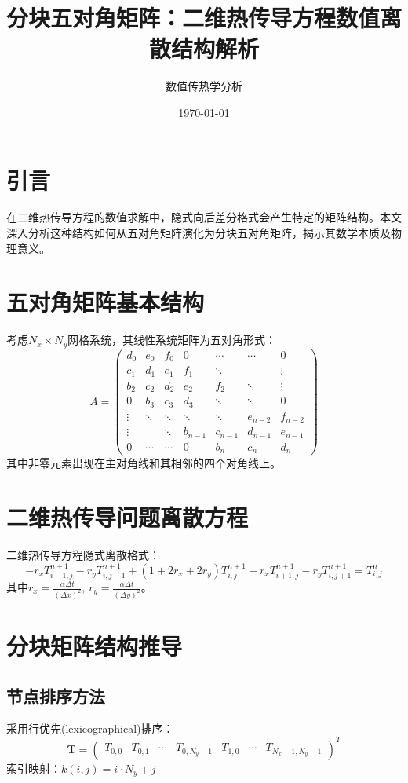\documentclass{ctexart}
\title{分块五对角矩阵：二维热传导方程数值离散结构解析}
\author{数值传热学分析}
\date{\today}
\begin{document}
\maketitle

\section{引言}
在二维热传导方程的数值求解中，隐式向后差分格式会产生特定的矩阵结构。本文深入分析这种结构如何从五对角矩阵演化为分块五对角矩阵，揭示其数学本质及物理意义。

\section{五对角矩阵基本结构}
考虑$N_x \times N_y$网格系统，其线性系统矩阵为五对角形式：
$$
A = \begin{pmatrix}
d_0 & e_0 & f_0 & 0 & \cdots & \cdots & 0 \\
c_1 & d_1 & e_1 & f_1 & \ddots & & \vdots \\
b_2 & c_2 & d_2 & e_2 & f_2 & \ddots & \vdots \\
0 & b_3 & c_3 & d_3 & \ddots & \ddots & 0 \\
\vdots & \ddots & \ddots & \ddots & \ddots & e_{n-2} & f_{n-2} \\
\vdots & & \ddots & b_{n-1} & c_{n-1} & d_{n-1} & e_{n-1} \\
0 & \cdots & \cdots & 0 & b_n & c_n & d_n
\end{pmatrix}
$$
其中非零元素出现在主对角线和其相邻的四个对角线上。

\section{二维热传导问题离散方程}
二维热传导方程隐式离散格式：
\begin{equation}
-r_x T_{i-1,j}^{n+1} - r_y T_{i,j-1}^{n+1} + (1+2r_x+2r_y)T_{i,j}^{n+1} - r_x T_{i+1,j}^{n+1} - r_y T_{i,j+1}^{n+1} = T_{i,j}^n
\label{eq:discrete}
\end{equation}
其中$r_x = \frac{\alpha \Delta t}{(\Delta x)^2}$, $r_y = \frac{\alpha \Delta t}{(\Delta y)^2}$。

\section{分块矩阵结构推导}

\subsection{节点排序方法}
采用行优先(lexicographical)排序：
$$
\mathbf{T} = \begin{pmatrix}
T_{0,0} & T_{0,1} & \cdots & T_{0,N_y-1} & T_{1,0} & \cdots & T_{N_x-1,N_y-1}
\end{pmatrix}^T
$$
索引映射：$k(i,j) = i \cdot N_y + j$
\end{document}

